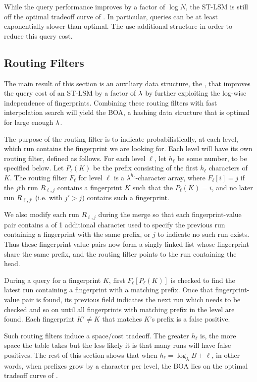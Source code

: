 While the query performance improves by a factor of $\log{N}$, the ST-LSM
is still off the optimal tradeoff curve of . In
particular, queries can be at least exponentially slower than optimal. The
\boa{} use additional structure in order to reduce this query cost.

\subsection{Routing Filters}\label{sec:boa-routing-filter}
The main result of this section is an auxiliary data structure, the
, that improves the query cost of an ST-LSM by a
factor of $\lambda$ by further exploiting the log-wise independence of
fingerprints.  Combining these routing filters with fast interpolation
search will yield the BOA, a hashing data structure that is optimal
for large enough $\lambda$. 

The purpose of the routing filter is to indicate probabilistically, at each
level, which run contains the fingerprint we are looking for. Each level will
have its own routing filter, defined as follows. For each level $\ell$, let
$h_\ell$ be some number, to be specified below. Let $P_\ell(K)$ be the prefix
consisting of the first $h_\ell$ characters of $K$. The routing filter $F_\ell$
for level $\ell$ is a $\lambda^{h_\ell}$-character array, where $F_\ell[i] = j$
if the $j$th run $R_{\ell,j}$ contains a fingerprint $K$ such that the
$P_\ell(K)=i$, and no later run $R_{\ell,j'}$ (i.e. with $j'>j$) contains such
a fingerprint.

We also modify each run $R_{\ell, j}$ during the merge so that each
fingerprint-value pair contains a  of 1 additional
character used to specify the previous run containing a fingerprint with the
same prefix, or $j$ to indicate no such run exists. Thus these fingerprint-value
pairs now form a singly linked list whose fingerprint share the same prefix,
and the routing filter points to the run containing the head.

During a query for a fingerprint $K$, first $F_\ell[P_\ell(K)]$ is checked to
find the latest run containing a fingerprint with a matching prefix. Once that
fingerprint-value pair is found, its previous field indicates the next run
which needs to be checked and so on until all fingerprints with matching prefix
in the level are found. Each fingerprint $K'\neq K$ that matches $K$'s prefix
is a false positive.

Such routing filters induce a space/cost tradeoff. The greater $h_\ell$ is, the
more space the table takes but the less likely it is that many runs will have
false positives. The rest of this section shows that when $h_\ell=\log_\lambda
B + \ell$, in other words, when prefixes grow by a character per level, the BOA
lies on the optimal tradeoff curve of .

